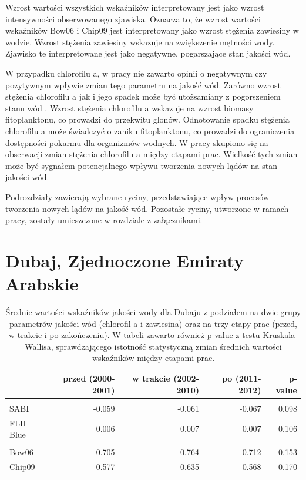 \documentclass{amuthesis}
\begin{document}
Wzrost wartości wszystkich wskaźników interpretowany jest jako wzrost
intensywności obserwowanego zjawiska. Oznacza to, że wzrost wartości
wskaźników Bow06 i Chip09 jest interpretowany jako wzrost stężenia
zawiesiny w wodzie. Wzrost stężenia zawiesiny wskazuje na zwiększenie
mętności wody. Zjawisko te interpretowane jest jako negatywne,
pogarszające stan jakości wód.

W przypadku chlorofilu a, w pracy nie zawarto opinii o negatywnym czy
pozytywnym wpływie zmian tego parametru na jakość wód. Zarówno wzrost
stężenia chlorofilu a jak i jego spadek może być utożsamiany z
pogorszeniem stanu wód \autocite{dembowska2021use}. Wzrost stężenia
chlorofilu a wskazuje na wzrost biomasy fitoplanktonu, co prowadzi do
przekwitu glonów. Odnotowanie spadku stężenia chlorofilu a może
świadczyć o zaniku fitoplanktonu, co prowadzi do ograniczenia
dostępności pokarmu dla organizmów wodnych. W pracy skupiono się na
obserwacji zmian stężenia chlorofilu a między etapami prac. Wielkość
tych zmian może być sygnałem potencjalnego wpływu tworzenia nowych lądów
na stan jakości wód.

Podrozdziały zawierają wybrane ryciny, przedstawiające wpływ procesów
tworzenia nowych lądów na jakość wód. Pozostałe ryciny, utworzone w
ramach pracy, zostały umieszczone w rozdziale z załącznikami.

\hypertarget{dubaj-zjednoczone-emiraty-arabskie-1}{%
\section{Dubaj, Zjednoczone Emiraty
Arabskie}\label{dubaj-zjednoczone-emiraty-arabskie-1}}

\hypertarget{tbl-db_stats}{}
\begin{table}
\caption{\label{tbl-db_stats}Średnie wartości wskaźników jakości wody dla Dubaju z podziałem na dwie
grupy parametrów jakości wód (chlorofil a i zawiesina) oraz na trzy
etapy prac (przed, w trakcie i po zakończeniu). W tabeli zawarto również
p-value z testu Kruskala-Wallisa, sprawdzającego istotność statystyczną
zmian średnich wartości wskaźników między etapami prac. }\tabularnewline

\centering
\begin{tabular}{lrrrr}
\toprule
  & przed (2000-2001) & w trakcie (2002-2010) & po (2011-2012) & p-value\\
\midrule
\addlinespace[0.3em]
\multicolumn{5}{l}{\textbf{chlorofil a}}\\
\hspace{1em}SABI & -0.059 & -0.061 & -0.067 & 0.098\\
\hspace{1em}FLH Blue & 0.006 & 0.007 & 0.007 & 0.106\\
\addlinespace[0.3em]
\multicolumn{5}{l}{\textbf{zawiesina}}\\
\hspace{1em}Bow06 & 0.705 & 0.764 & 0.712 & 0.153\\
\hspace{1em}Chip09 & 0.577 & 0.635 & 0.568 & 0.170\\
\bottomrule
\end{tabular}
\end{table}
\end{document}

